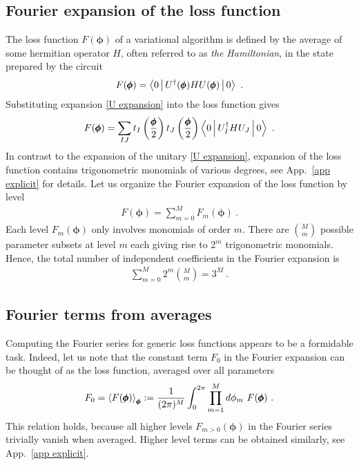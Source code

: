 \documentclass[twocolumn, amsfonts, amssymb, aps, nofootinbib]{revtex4-2}
\begin{document}
\subsection{Fourier expansion of the loss function}
The loss function $F(\pmb\phi)$ of a variational algorithm is defined by the average of some hermitian operator $H$, often referred to as \textit{the Hamiltonian}, in the state prepared by the circuit 
\begin{align}
	F(\pmb{\phi})=\Braket{0|U^\dagger(\pmb\phi)HU(\pmb\phi)|0} \ . \label{F def}
\end{align}
Substituting expansion \eqref{U expansion} into the loss function gives
\begin{align}
	F(\pmb{\phi})=\sum_{IJ}t_I\left(\frac{\pmb \phi}{2}\right)t_J\left(\frac{\pmb \phi}{2}\right)\Braket{0|U^\dagger_IHU_J|0} \ . \label{F exp}
\end{align}
In contrast to the expansion of the unitary \eqref{U expansion}, expansion of the loss function contains trigonometric monomials of various degrees, see App.~\ref{app explicit} for details. Let us organize the Fourier expansion of the loss function by level
\begin{align}
	F(\pmb\phi)=\sum_{m=0}^M F_m(\pmb\phi) \ . \label{Fm def}
\end{align}
Each level $F_m(\pmb\phi)$ only involves monomials of order $m$.
There are $\binom{M}{m}$ possible parameter subsets at level $m$ each giving rise to $2^m$ trigonometric monomials. Hence, the total number of independent coefficients in the Fourier expansion is
\begin{align}
	\sum_{m=0}^M 2^{m}\binom{M}{m}=3^M \label{3M coeffs} \ .
\end{align}
\subsection{Fourier terms from averages}
Computing the Fourier series for generic loss functions appears to be a formidable task. Indeed, let us note that the constant term $F_0$ in the Fourier expansion can be thought of as the loss function,  averaged over all parameters
\begin{align}
	F_0=\Braket{F(\pmb\phi)}_{\pmb\phi}:=\frac{1}{(2\pi)^M}\int_0^{2\pi}\prod_{m=1}^Md\phi_m\,\, F(\pmb\phi) \ . \label{F avg}
\end{align}
This relation holds, because all higher levels $F_{m>0}(\pmb\phi)$ in the Fourier series trivially vanish when averaged. Higher level terms can be obtained similarly, see App.~\ref{app explicit}.
\end{document}
